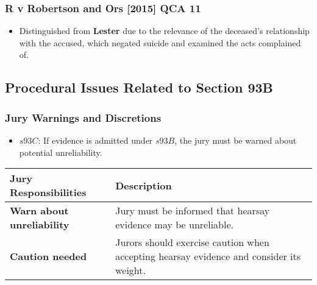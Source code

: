 \subsubsection{R v Robertson and Ors {[}2015{]} QCA
11}\label{r-v-robertson-and-ors-2015-qca-11}

\begin{itemize}
\tightlist
\item
  Distinguished from \textbf{Lester} due to the relevance of the
  deceased's relationship with the accused, which negated suicide and
  examined the acts complained of.
\end{itemize}

\subsection{  Procedural Issues Related to Section
93B}\label{procedural-issues-related-to-section-93b}

\subsubsection{Jury Warnings and
Discretions}\label{jury-warnings-and-discretions}

\begin{itemize}
\tightlist
\item
  \(s93C\): If evidence is admitted under \(s93B\), the jury must be
  warned about potential unreliability.
\end{itemize}

\begin{longtable}[]{@{}
  >{\raggedright\arraybackslash}p{}
  >{\raggedright\arraybackslash}p{}@{}}
\toprule\noalign{}
\begin{minipage}[b]{\linewidth}\raggedright
Jury Responsibilities
\end{minipage} & \begin{minipage}[b]{\linewidth}\raggedright
Description
\end{minipage} \\
\midrule\noalign{}
\endhead
\bottomrule\noalign{}
\endlastfoot
\textbf{Warn about unreliability} & Jury must be informed that hearsay
evidence may be unreliable. \\
\textbf{Caution needed} & Jurors should exercise caution when accepting
hearsay evidence and consider its weight. \\
\end{longtable}

